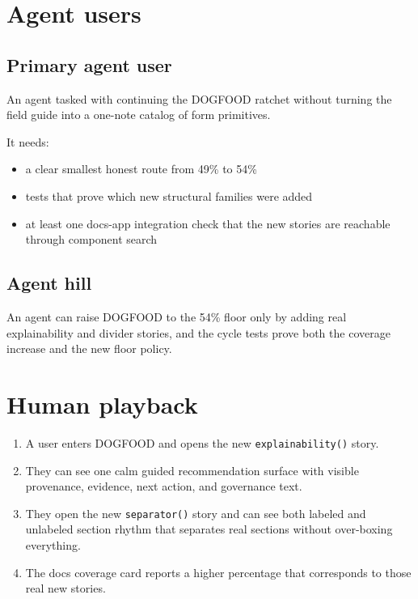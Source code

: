 \section{Agent users}\label{record-074-agent-users}

\subsection{Primary agent user}\label{record-074-primary-agent-user}

An agent tasked with continuing the DOGFOOD ratchet without turning the field guide into a one-note catalog of form primitives.

It needs:

\begin{itemize}
\tightlist
\item
  a clear smallest honest route from 49\% to 54\%
\item
  tests that prove which new structural families were added
\item
  at least one docs-app integration check that the new stories are reachable through component search
\end{itemize}

\subsection{Agent hill}\label{record-074-agent-hill}

An agent can raise DOGFOOD to the 54\% floor only by adding real explainability and divider stories, and the cycle tests prove both the coverage increase and the new floor policy.

\section{Human playback}\label{record-074-human-playback}

\begin{enumerate}
\def\labelenumi{\arabic{enumi}.}
\tightlist
\item
  A user enters DOGFOOD and opens the new \texttt{e\allowbreak{}x\allowbreak{}p\allowbreak{}l\allowbreak{}a\allowbreak{}i\allowbreak{}n\allowbreak{}a\allowbreak{}b\allowbreak{}i\allowbreak{}l\allowbreak{}i\allowbreak{}t\allowbreak{}y\allowbreak{}(\allowbreak{})} story.
\item
  They can see one calm guided recommendation surface with visible provenance, evidence, next action, and governance text.
\item
  They open the new \texttt{s\allowbreak{}e\allowbreak{}p\allowbreak{}a\allowbreak{}r\allowbreak{}a\allowbreak{}t\allowbreak{}o\allowbreak{}r\allowbreak{}(\allowbreak{})} story and can see both labeled and unlabeled section rhythm that separates real sections without over-boxing everything.
\item
  The docs coverage card reports a higher percentage that corresponds to those real new stories.
\end{enumerate}

